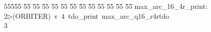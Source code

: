 %
%
\begin{tabbing}
55555 \= 55 \= 55 \= 55 \= 55 \= 55 \= 55 \= 55 \= 55 \= 55 \= 55 \= 55 \= 55 \= \>max\_arc\_16\_4r\_print:\\[0pt]
2\>$\triangleright$\>(ORBITER)\ v\ 4\ tdo\_print\ max\_arc\_q16\_r4rtdo\ \\[0pt]
3\>\end{tabbing}
